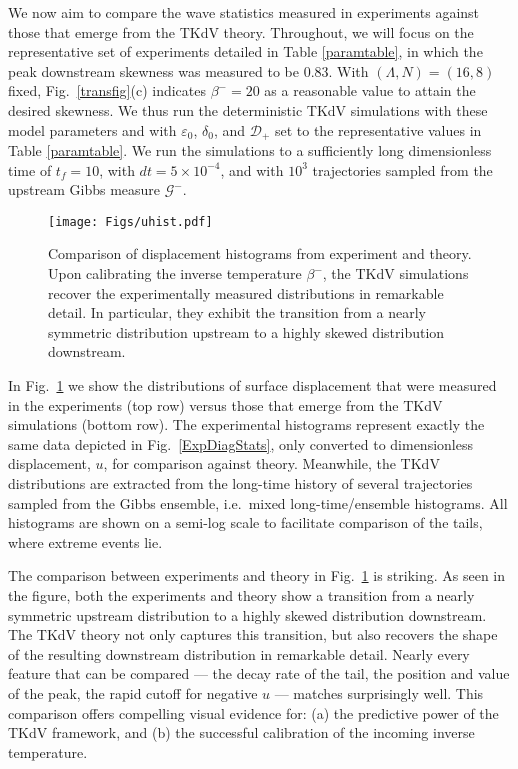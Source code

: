 \documentclass[11pt]{article}
\newcommand{\eps}{\varepsilon}
\newcommand{\lamfac}{N}
\newcommand{\drat}{\mathcal{D}}
\newcommand{\dratdn}{\drat_+}
\newcommand{\epsup}{\eps_0}
\newcommand{\delup}{\delta_0}
\newcommand{\Gibbs}{\mathcal{G}}
\newcommand{\Gup}{\Gibbs^{-}}
\newcommand{\invtemp}{\beta}
\newcommand{\itup}{\invtemp^{-}}
\begin{document}
	We now aim to compare the wave statistics measured in experiments against those that emerge from the TKdV theory. Throughout, we will focus on the representative set of experiments detailed in Table \ref{paramtable}, in which the peak downstream skewness was measured to be 0.83. 
With $(\Lambda, \lamfac) = (16, 8)$ fixed, Fig.~\ref{transfig}(c) indicates $\itup = 20$ as a reasonable value to attain the desired skewness. We thus run the deterministic TKdV simulations with these model parameters and with $\epsup$, $\delup$, and $\dratdn$ set to the representative values in Table \ref{paramtable}. We run the simulations to a sufficiently long dimensionless time of $t_{f} = 10$, with $dt = 5 \times 10^{-4}$, and with $10^3$ trajectories sampled from the upstream Gibbs measure $\Gup$.

\begin{figure}%
\begin{center}
\texttt{[image: Figs/uhist.pdf]}
\caption{ 
Comparison of displacement histograms from experiment and theory. Upon calibrating the inverse temperature $\itup$, the TKdV simulations recover the experimentally measured distributions in remarkable detail. In particular, they exhibit the transition from a nearly symmetric distribution upstream to a highly skewed distribution downstream.
}
\label{uhist}
\end{center}
\end{figure}
 
	In Fig.~\ref{uhist} we show the distributions of surface displacement that were measured in the experiments (top row) versus those that emerge from the TKdV simulations (bottom row). The experimental histograms represent exactly the same data depicted in Fig.~\ref{ExpDiagStats}, only converted to dimensionless displacement, $u$, for comparison against theory. Meanwhile, the TKdV distributions are extracted  from the long-time history of several trajectories sampled from the Gibbs ensemble, i.e.~mixed long-time/ensemble histograms. All histograms are shown on a semi-log scale to facilitate comparison of the tails, where extreme events lie.

	The comparison between experiments and theory in Fig.~\ref{uhist} is striking. As seen in the figure, both the experiments and theory show a transition from a nearly symmetric upstream distribution to a highly skewed distribution downstream. The TKdV theory not only captures this transition, but also recovers the shape of the resulting downstream distribution in remarkable detail. Nearly every feature that can be compared --- the decay rate of the tail, the position and value of the peak, the rapid cutoff for negative $u$ --- matches surprisingly well. This comparison offers compelling visual evidence for: (a) the predictive power of the TKdV framework, and (b) the successful calibration of the incoming inverse temperature.
\end{document}
